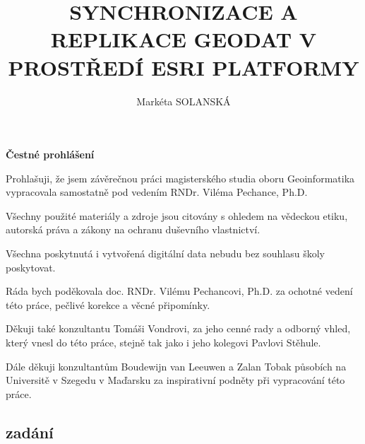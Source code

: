 \documentclass{thesisKGI}
\title{SYNCHRONIZACE A REPLIKACE GEODAT V PROSTŘEDÍ ESRI PLATFORMY}
\author{Markéta SOLANSKÁ}
\begin{document}
    \sloppy       %
    \maketitle    %


    \begin{declaration}
      \textbf{Čestné prohlášení}

      Prohlašuji, že jsem závěrečnou práci magisterského studia oboru Geoinformatika vypracovala samostatně pod vedením RNDr. Viléma Pechance, Ph.D.

      Všechny použité materiály a zdroje jsou citovány s ohledem na vědeckou etiku, autorská práva a zákony na ochranu duševního vlastnictví.

      Všechna poskytnutá i vytvořená digitální data nebudu bez souhlasu školy poskytovat.
    \end{declaration}


    \begin{dedication}

      Ráda bych poděkovala doc. RNDr. Vilému Pechancovi, Ph.D. za ochotné vedení této práce, pečlivé korekce a věcné připomínky.

      Děkuji také konzultantu Tomáši Vondrovi, za jeho cenné rady a odborný vhled, který vnesl do této práce, stejně tak jako i jeho kolegovi Pavlovi Stěhule.

      Dále děkuji konzultantům Boudewijn van Leeuwen a Zalan Tobak působích na Universitě v Szegedu v Maďarsku za inspirativní podněty při vypracování této práce.
      \vspace{4em}
    \end{dedication}


    \newpage
    \begin{center}
    \section*{zadání}
    \end{center}
\end{document}
